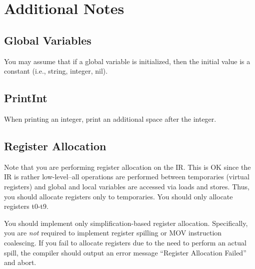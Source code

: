 \documentclass{article}
\begin{document}
%

\section{Additional Notes}
\subsection{Global Variables}
You may assume that if a global variable is initialized,
then the initial value is a constant (i.e., string, integer, nil).
\subsection{PrintInt}
When printing an integer, print an additional space after the integer.
\subsection{Register Allocation}
Note that you are performing register allocation on the IR.
This is OK since the IR is rather low-level--all operations are performed between temporaries (virtual registers) and global and local variables are accessed via loads and stores. 
Thus, you should allocate registers only to temporaries.
You should only allocate registers t0-t9.

You should implement only simplification-based register allocation. 
Specifically, you are \emph{not} required to implement register spilling or MOV instruction coalescing.  If you fail to allocate registers due to the need to perform an actual spill, the compiler should output an error message ``Register Allocation Failed'' and abort.
\end{document}
